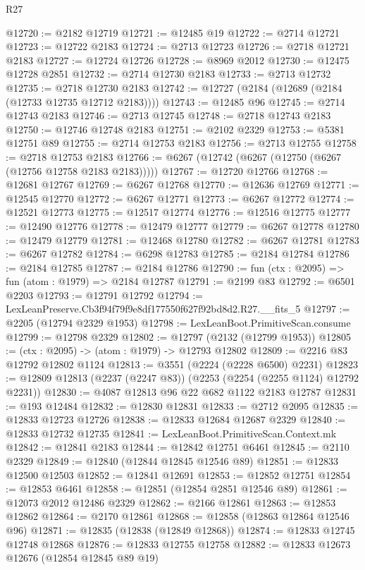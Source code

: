 \begin{lexlean}{R27}
\begin{coremodule}
@12720 := @2182 @12719
@12721 := @12485 @19
@12722 := @2714 @12721
@12723 := @12722 @2183
@12724 := @2713 @12723
@12726 := @2718 @12721 @2183
@12727 := @12724 @12726
@12728 := @8969 @2012
@12730 := @12475 @12728 @2851
@12732 := @2714 @12730 @2183
@12733 := @2713 @12732
@12735 := @2718 @12730 @2183
@12742 := @12727 (@2184 (@12689 (@2184 (@12733 @12735 @12712 @2183))))
@12743 := @12485 @96
@12745 := @2714 @12743 @2183
@12746 := @2713 @12745
@12748 := @2718 @12743 @2183
@12750 := @12746 @12748 @2183
@12751 := @2102 @2329
@12753 := @5381 @12751 @89
@12755 := @2714 @12753 @2183
@12756 := @2713 @12755
@12758 := @2718 @12753 @2183
@12766 := @6267 (@12742 (@6267 (@12750 (@6267 (@12756 @12758 @2183 @2183)))))
@12767 := @12720 @12766
@12768 := @12681 @12767
@12769 := @6267 @12768
@12770 := @12636 @12769
@12771 := @12545 @12770
@12772 := @6267 @12771
@12773 := @6267 @12772
@12774 := @12521 @12773
@12775 := @12517 @12774
@12776 := @12516 @12775
@12777 := @12490 @12776
@12778 := @12479 @12777
@12779 := @6267 @12778
@12780 := @12479 @12779
@12781 := @12468 @12780
@12782 := @6267 @12781
@12783 := @6267 @12782
@12784 := @6298 @12783
@12785 := @2184 @12784
@12786 := @2184 @12785
@12787 := @2184 @12786
@12790 := fun (ctx : @2095) => fun (atom : @1979) => @2184 @12787
@12791 := @2199 @83
@12792 := @6501 @2203
@12793 := @12791 @12792
@12794 := LexLeanPreserve.Cb3f94f79f9e8df177550f627f92bd8d2.R27.__fits_5
@12797 := @2205 (@12794 @2329 @1953)
@12798 := LexLeanBoot.PrimitiveScan.consume
@12799 := @12798 @2329
@12802 := @12797 (@2132 (@12799 @1953))
@12805 := (ctx : @2095) -> (atom : @1979) -> @12793 @12802
@12809 := @2216 @83 @12792 @12802 @1124
@12813 := @3551 (@2224 (@2228 @6500) @2231)
@12823 := @12809 @12813 (@2237 (@2247 @83)) (@2253 (@2254 (@2255 @1124) @12792 @2231))
@12830 := @4087 @12813 @96 @22 @682 @1122 @2183 @12787
@12831 := @193 @12484
@12832 := @12830 @12831
@12833 := @2712 @2095
@12835 := @12833 @12723 @12726
@12838 := @12833 @12684 @12687 @2329
@12840 := @12833 @12732 @12735
@12841 := LexLeanBoot.PrimitiveScan.Context.mk
@12842 := @12841 @2183
@12844 := @12842 @12751 @6461
@12845 := @2110 @2329
@12849 := @12840 (@12844 @12845 @12546 @89)
@12851 := @12833 @12500 @12503
@12852 := @12841 @12691
@12853 := @12852 @12751
@12854 := @12853 @6461
@12858 := @12851 (@12854 @2851 @12546 @89)
@12861 := @12073 @2012 @12486 @2329
@12862 := @2166 @12861
@12863 := @12853 @12862
@12864 := @2170 @12861
@12868 := @12858 (@12863 @12864 @12546 @96)
@12871 := @12835 (@12838 (@12849 @12868))
@12874 := @12833 @12745 @12748 @12868
@12876 := @12833 @12755 @12758
@12882 := @12833 @12673 @12676 (@12854 @12845 @89 @19)

\end{coremodule}
\end{lexlean}
